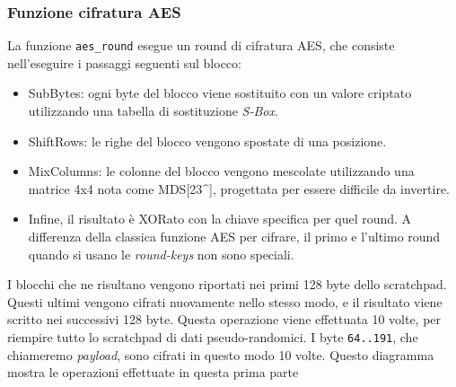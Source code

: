 \documentclass[
]{article}
\providecommand{\tightlist}{%
  \setlength{\itemsep}{0pt}\setlength{\parskip}{0pt}}
\begin{document}
\subsubsection{Funzione cifratura AES}\label{funzione-cifratura-aes}

La funzione \texttt{aes\_round} esegue un round di cifratura AES, che
consiste nell'eseguire i passaggi seguenti sul blocco:

\begin{itemize}
\tightlist
\item
  SubBytes: ogni byte del blocco viene sostituito con un valore criptato
  utilizzando una tabella di sostituzione \emph{S-Box}.
\item
  ShiftRows: le righe del blocco vengono spostate di una posizione.
\item
  MixColumns: le colonne del blocco vengono mescolate utilizzando una
  matrice 4x4 nota come MDS{[}23\^{}{]}, progettata per essere difficile
  da invertire.
\item
  Infine, il risultato è XORato con la chiave specifica per quel round.
  A differenza della classica funzione AES per cifrare, il primo e
  l'ultimo round quando si usano le \emph{round-keys} non sono speciali.
\end{itemize}

I blocchi che ne risultano vengono riportati nei primi 128 byte dello
scratchpad. Questi ultimi vengono cifrati nuovamente nello stesso modo,
e il risultato viene scritto nei successivi 128 byte. Questa operazione
viene effettuata 10 volte, per riempire tutto lo scratchpad di dati
pseudo-randomici. I byte \texttt{64..191}, che chiameremo
\emph{payload}, sono cifrati in questo modo 10 volte. Questo diagramma
mostra le operazioni effettuate in questa prima parte
\end{document}
